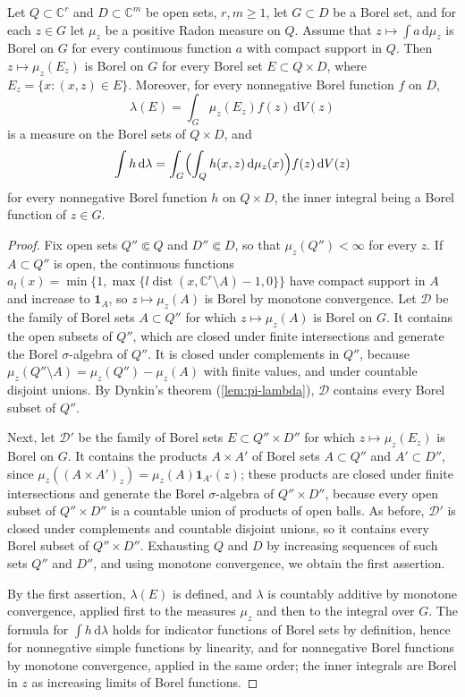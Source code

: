 \begin{lemma}\label{lem:measurable-fibre-family}
Let $Q\subset\mathbb C^r$ and $D\subset\mathbb C^m$ be open sets, $r,m\geq1$, let $G\subset D$ be a Borel set, and for each $z\in G$ let $\mu_z$ be a positive Radon measure on $Q$. Assume that $z\mapsto\int a\,\mathrm d\mu_z$ is Borel on $G$ for every continuous function $a$ with compact support in $Q$. Then $z\mapsto\mu_z(E_z)$ is Borel on $G$ for every Borel set $E\subset Q\times D$, where $E_z=\{x:(x,z)\in E\}$. Moreover, for every nonnegative Borel function $f$ on $D$,
\[
 \lambda(E)=\int_G\mu_z(E_z)f(z)\,\mathrm dV(z)
\]
is a measure on the Borel sets of $Q\times D$, and
\[
 \int h\,\mathrm d\lambda=\int_G\Bigl(\int_Qh(x,z)\,\mathrm d\mu_z(x)\Bigr)f(z)\,\mathrm dV(z)
\]
for every nonnegative Borel function $h$ on $Q\times D$, the inner integral being a Borel function of $z\in G$.
\end{lemma}
\begin{proof}
Fix open sets $Q''\Subset Q$ and $D''\Subset D$, so that $\mu_z(Q'')<\infty$ for every $z$. If $A\subset Q''$ is open, the continuous functions $a_l(x)=\min\{1,\max\{l\operatorname{dist}(x,\mathbb C^r\setminus A)-1,0\}\}$ have compact support in $A$ and increase to $\mathbf1_A$, so $z\mapsto\mu_z(A)$ is Borel by monotone convergence. Let $\mathcal D$ be the family of Borel sets $A\subset Q''$ for which $z\mapsto\mu_z(A)$ is Borel on $G$. It contains the open subsets of $Q''$, which are closed under finite intersections and generate the Borel $\sigma$-algebra of $Q''$. It is closed under complements in $Q''$, because $\mu_z(Q''\setminus A)=\mu_z(Q'')-\mu_z(A)$ with finite values, and under countable disjoint unions. By Dynkin's theorem (\cref{lem:pi-lambda}), $\mathcal D$ contains every Borel subset of $Q''$.

Next, let $\mathcal D'$ be the family of Borel sets $E\subset Q''\times D''$ for which $z\mapsto\mu_z(E_z)$ is Borel on $G$. It contains the products $A\times A'$ of Borel sets $A\subset Q''$ and $A'\subset D''$, since $\mu_z((A\times A')_z)=\mu_z(A)\mathbf1_{A'}(z)$; these products are closed under finite intersections and generate the Borel $\sigma$-algebra of $Q''\times D''$, because every open subset of $Q''\times D''$ is a countable union of products of open balls. As before, $\mathcal D'$ is closed under complements and countable disjoint unions, so it contains every Borel subset of $Q''\times D''$. Exhausting $Q$ and $D$ by increasing sequences of such sets $Q''$ and $D''$, and using monotone convergence, we obtain the first assertion.

By the first assertion, $\lambda(E)$ is defined, and $\lambda$ is countably additive by monotone convergence, applied first to the measures $\mu_z$ and then to the integral over $G$. The formula for $\int h\,\mathrm d\lambda$ holds for indicator functions of Borel sets by definition, hence for nonnegative simple functions by linearity, and for nonnegative Borel functions by monotone convergence, applied in the same order; the inner integrals are Borel in $z$ as increasing limits of Borel functions.
\end{proof}


